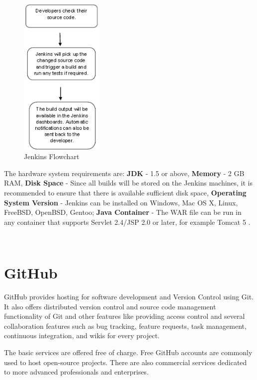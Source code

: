 \documentclass[12pt,a4paper,twoside]{article}
\begin{document}
\begin{figure}[H]
    \centering
        \includegraphics[width=4cm]{images-aws/jenkins_flowchart.png}
        \caption{Jenkins Flowchart \cite{JENKINS-FLOWCHART}}
        \label{fig:jenkinsFlow}
\end{figure}


The hardware system requirements are: \textbf{JDK} - 1.5 or above, \textbf{Memory} - 2 GB RAM, 
 \textbf{Disk Space} - Since all builds will be stored on the Jenkins machines, it is recommended to ensure that there is available sufficient disk space, \textbf{Operating System Version} - Jenkins can be installed on Windows, Mac OS X, Linux, FreeBSD, OpenBSD, Gentoo; \textbf{Java Container} - The WAR file can be run in any container that supports Servlet 2.4/JSP 2.0 or later, for example Tomcat 5 \cite{JENKINS-FLOWCHART}.




~\newpage


\section{GitHub}


GitHub provides hosting for software development and Version Control using Git. It also offers distributed version control and source code management functionality of Git and other features like providing access control and several collaboration features such as bug tracking, feature requests, task management, continuous integration, and wikis for every project.


The basic services are offered free of charge. Free GitHub accounts are commonly used to host open-source projects. There are also commercial services dedicated to more advanced professionals and enterprises.
\end{document}
